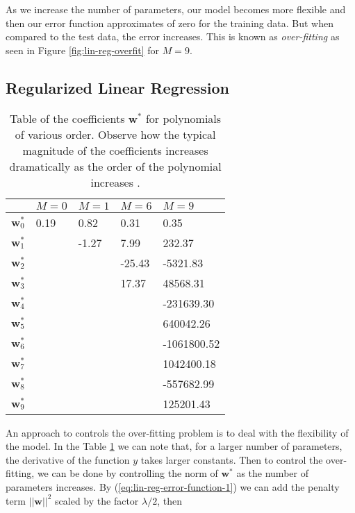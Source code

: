 \documentclass[11pt]{article} %
\begin{document}
As we increase the number of parameters, our model becomes more flexible and then our error function approximates of zero for the training data. But when compared to the test data, the error increases. This is known as \textit{over-fitting} as seen in Figure \ref{fig:lin-reg-overfit} for $M=9$.

\subsection{Regularized Linear Regression}

\begin{table}[htpb]
   \centering
   \begin{tabular}{l| l l l l}
     & $M=0$ & $M=1$ & $M=6$ & $M=9$ \\
   \hline
   $\mathbf{w}_0^*$ & 0.19 & 0.82   & 0.31   & 0.35\\
   $\mathbf{w}_1^*$ &      & -1.27  & 7.99   & 232.37\\
   $\mathbf{w}_2^*$ &      &        & -25.43 & -5321.83\\
   $\mathbf{w}_3^*$ &      &        & 17.37  & 48568.31\\
   $\mathbf{w}_4^*$ &      &        &        & -231639.30\\
   $\mathbf{w}_5^*$ &      &        &        & 640042.26\\
   $\mathbf{w}_6^*$ &      &        &        & -1061800.52\\
   $\mathbf{w}_7^*$ &      &        &        & 1042400.18\\
   $\mathbf{w}_8^*$ &      &        &        & -557682.99\\
   $\mathbf{w}_9^*$ &      &        &        & 125201.43\\
   \end{tabular}
   \caption{Table of the coefficients $\mathbf{w} ^*$ for polynomials of various order. Observe how the typical magnitude of the coefficients increases dramatically as the order of the polynomial increases \cite{Bishop:2006:PRM:1162264}.}
   \label{tab:reg-lin-reg-weights}
   \end{table}

An approach to controls the over-fitting problem is to deal with the flexibility of the model. In the Table \ref{tab:reg-lin-reg-weights} we can note that, for a larger number of parameters, the derivative of the function $y$ takes larger constants. Then to control the over-fitting, we can be done by controlling the norm of $\mathbf{w}^*$ as the number of parameters increases. By (\ref{eq:lin-reg-error-function-1}) we can add the penalty term $||\mathbf{w}||^2 $ scaled by the factor $\lambda / 2$, then
\end{document}
